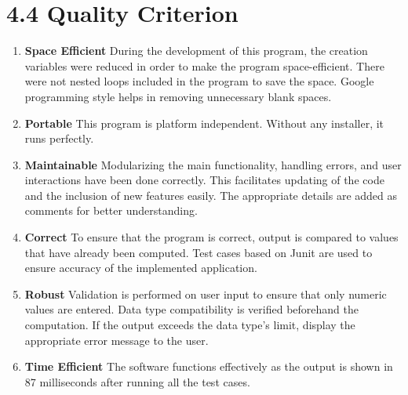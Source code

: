 \documentclass[12pt]{article}
\begin{document}
\section*{4.4 Quality Criterion}
    \begin{enumerate}
        \item \textbf{Space Efficient}
        \newline
        During the development of this program, the creation variables were reduced in order to make the program space-efficient. There were not nested loops included in the program to save the space. Google programming style helps in removing unnecessary blank spaces.
        \item \textbf{Portable}
        \newline
        This program is platform independent. Without any installer, it runs perfectly.
        \item \textbf{Maintainable}
        \newline
        Modularizing the main functionality, handling errors, and user interactions have been done correctly. This facilitates updating of the code and the inclusion of new features easily. The appropriate details are added as comments for better understanding.
        \item \textbf{Correct}
        \newline
        To ensure that the program is correct, output is compared to values that have already been computed. Test cases based on Junit are used to ensure accuracy of the implemented application.
        \item \textbf{Robust}
        \newline
        Validation is performed on user input to ensure that only numeric values are entered. Data type compatibility is verified beforehand the computation. If the output exceeds the data type's limit, display the appropriate error message to the user.
        \item \textbf{Time Efficient}
        \newline
        The software functions effectively as the output is shown in 87 milliseconds after running all the test cases.
        \pagebreak
        \begin{figure}[h!]
        \centering

\end{figure}
\end{enumerate}
\end{document}
